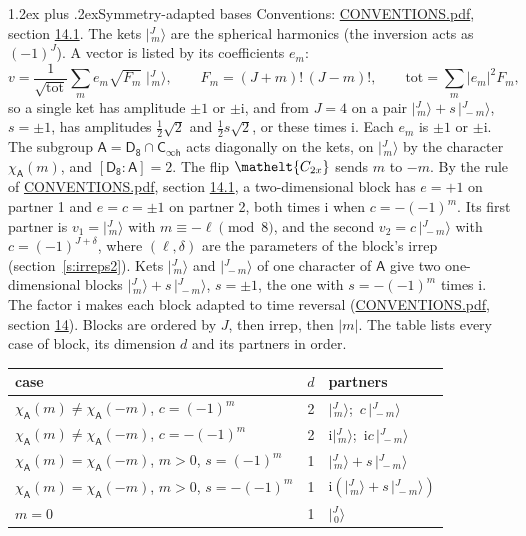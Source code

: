 \documentclass[10pt,a4paper]{article}
\makeatletter
\renewcommand\section{\@startsection{section}{1}{\z@}{-3ex plus -1ex minus -.2ex}%
  {1.2ex plus .2ex}{\normalfont\large\sffamily\bfseries\color{parttitle}}}
\numberwithin{equation}{section}
\newcommand{\eltfont}[1]{{\let\sigma\eltsigma\mathelt{#1}}}
\newcommand{\grp}[1]{\mathsf{#1}}
\newcommand{\elt}[1]{\eltfont{#1}}
\newcommand{\grpindex}[2]{[#1 : #2]}
\newcommand{\iunit}{\mathrm{i}}
\newcommand{\chiA}{\chi_{\grp{A}}}
\newcommand{\jm}[2]{\bigl\lvert{}^{#1}_{\,#2}\bigr\rangle}
\makeatother
\begin{document}
\section{Symmetry-adapted bases}\label{s:bases}
Conventions: \href{../../CONVENTIONS.pdf}{CONVENTIONS.pdf}, section \href{../../CONVENTIONS.pdf\#conv.14.1}{14.1}.
\leavevmode\label{n:index.m}\label{n:vector.ket}The kets $\jm{J}{m}$ are the spherical harmonics (the inversion acts as $(-1)^J$). \label{n:index.ketcoefficient}\label{n:vector.basis.symmetry}\label{n:index.ketweight}\label{n:index.total}A vector is listed by its coefficients $e_m$:
\begin{equation}\label{e:ket}v = \frac{1}{\sqrt{\mathrm{tot}}}\sum_m e_m\sqrt{F_m}\;\jm{J}{m},\qquad F_m = (J+m)!\,(J-m)!,\qquad \mathrm{tot} = \sum_m |e_m|^2F_m,\end{equation}
\leavevmode\label{n:index.pair.sign}so a single ket has amplitude $\pm1$ or $\pm\iunit$, and from $J = 4$ on a pair $\jm{J}{m} + s\,\jm{J}{-m}$, $s = \pm1$, has amplitudes $\tfrac{1}{2}\sqrt{2}$ and $\tfrac{1}{2}s\sqrt{2}$, or these times $\iunit$. Each $e_m$ is $\pm1$ or $\pm\iunit$.
\leavevmode\label{n:group.A}\label{n:function.character.abelian}The subgroup $\grp{A} = \grp{D_{8}}\cap\grp{C_{\infty h}}$ acts diagonally on the kets, on $\jm{J}{m}$ by the character $\chiA(m)$, and $\grpindex{\grp{D_{8}}}{\grp{A}} = 2$. The flip $\elt{C_{2x}}$ sends $m$ to $-m$. \label{n:index.partner.sign}By the rule of \href{../../CONVENTIONS.pdf}{CONVENTIONS.pdf}, section \href{../../CONVENTIONS.pdf\#conv.14.1}{14.1}, a two-dimensional block has $e = +1$ on partner 1 and $e = c = \pm1$ on partner 2, both times $\iunit$ when $c = -(-1)^m$. Its first partner is $v_1 = \jm{J}{m}$ with $m \equiv -\ell \pmod{8}$, and the second $v_2 = c\,\jm{J}{-m}$ with $c = (-1)^{J+\delta}$, where $(\ell, \delta)$ are the parameters of the block's irrep (section~\ref{s:irreps2}). Kets $\jm{J}{m}$ and $\jm{J}{-m}$ of one character of $\grp{A}$ give two one-dimensional blocks $\jm{J}{m} + s\,\jm{J}{-m}$, $s = \pm1$, the one with $s = -(-1)^m$ times $\iunit$. The factor $\iunit$ makes each block adapted to time reversal (\href{../../CONVENTIONS.pdf}{CONVENTIONS.pdf}, section \href{../../CONVENTIONS.pdf\#conv.14}{14}). Blocks are ordered by $J$, then irrep, then $|m|$.
\leavevmode\label{n:head.case}\label{n:head.partners}The table lists every case of block, its dimension $d$ and its partners in order.
\begin{center}\begin{tabular}{@{}lrl@{}}\toprule
case & $d$ & partners\\\midrule
$\chiA(m) \ne \chiA(-m)$, $c = (-1)^m$ & 2 & $\jm{J}{m}$;\ $c\,\jm{J}{-m}$\\
$\chiA(m) \ne \chiA(-m)$, $c = -(-1)^m$ & 2 & $\iunit\jm{J}{m}$;\ $\iunit c\,\jm{J}{-m}$\\
$\chiA(m) = \chiA(-m)$, $m > 0$, $s = (-1)^m$ & 1 & $\jm{J}{m} + s\,\jm{J}{-m}$\\
$\chiA(m) = \chiA(-m)$, $m > 0$, $s = -(-1)^m$ & 1 & $\iunit(\jm{J}{m} + s\,\jm{J}{-m})$\\
$m = 0$ & 1 & $\jm{J}{0}$\\
\bottomrule\end{tabular}\end{center}
\end{document}
